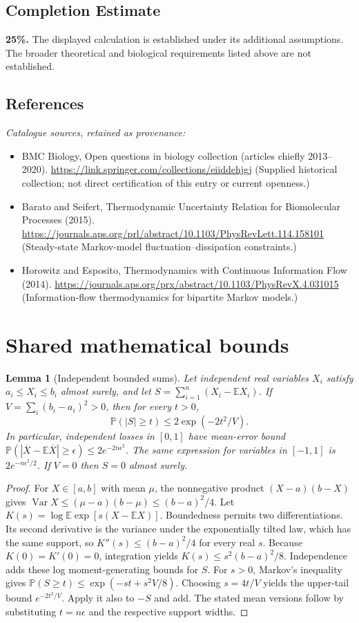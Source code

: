 \documentclass[11pt]{article}
\newcommand{\E}{\mathbb E}
\newcommand{\Prob}{\mathbb P}
\DeclareMathOperator{\Var}{Var}
\providecommand{\E}{\mathbb E}
\providecommand{\Prob}{\mathbb P}
\providecommand{\Var}{\operatorname{Var}}
\newtheorem{sharedlemma}{Lemma}[section]
\begin{document}
\subsection{Completion Estimate}
\textbf{25\%.} The displayed calculation is established under its additional assumptions. The broader theoretical and biological requirements listed above are not established.
\subsection{References}
\noindent\emph{Catalogue sources, retained as provenance:}
\begin{itemize}
\item BMC Biology, Open questions in biology collection (articles chiefly 2013--2020). \url{https://link.springer.com/collections/eiiddehjgj} (Supplied historical collection; not direct certification of this entry or current openness.)
\item Barato and Seifert, Thermodynamic Uncertainty Relation for Biomolecular Processes (2015). \url{https://journals.aps.org/prl/abstract/10.1103/PhysRevLett.114.158101} (Steady-state Markov-model fluctuation--dissipation constraints.)
\item Horowitz and Esposito, Thermodynamics with Continuous Information Flow (2014). \url{https://journals.aps.org/prx/abstract/10.1103/PhysRevX.4.031015} (Information-flow thermodynamics for bipartite Markov models.)
\end{itemize}
\clearpage


\appendix
\section{Shared mathematical bounds}\label{app:bounds}
\begin{sharedlemma}[Independent bounded sums]\label{lem:bounded}
Let independent real variables $X_i$ satisfy $a_i\leq X_i\leq b_i$ almost surely,
and let $S=\sum_{i=1}^n(X_i-\E X_i)$. If
$V=\sum_i(b_i-a_i)^2>0$, then for every $t>0$,
\[
 \Prob(|S|\geq t)\leq 2\exp(-2t^2/V).
\]
In particular, independent losses in $[0,1]$ have mean-error bound
$\Prob(|\overline X-\E\overline X|\geq\epsilon)
\leq2e^{-2n\epsilon^2}$. The same expression for variables in $[-1,1]$
is $2e^{-n\epsilon^2/2}$. If $V=0$ then $S=0$ almost surely.
\end{sharedlemma}
\begin{proof}
For $X\in[a,b]$ with mean $\mu$, the nonnegative product
$(X-a)(b-X)$ gives
$\Var X\leq(\mu-a)(b-\mu)\leq(b-a)^2/4$.
Let $K(s)=\log\E\exp[s(X-\E X)]$.
Boundedness permits two differentiations. Its second derivative is the variance
under the exponentially tilted law, which has the same support, so
$K''(s)\leq(b-a)^2/4$ for every real $s$.
Because $K(0)=K'(0)=0$, integration yields
$K(s)\leq s^2(b-a)^2/8$.
Independence adds these log moment-generating bounds for $S$.
For $s>0$, Markov's inequality gives
$\Prob(S\geq t)\leq\exp(-st+s^2V/8)$.
Choosing $s=4t/V$ yields the upper-tail bound $e^{-2t^2/V}$.
Apply it also to $-S$ and add. The stated mean versions follow by substituting
$t=n\epsilon$ and the respective support widths.
\end{proof}
\end{document}
